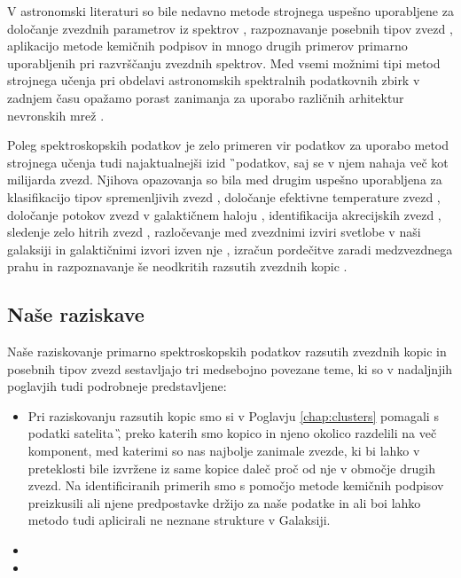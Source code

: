 V astronomski literaturi so bile nedavno metode strojnega uspešno uporabljene za določanje zvezdnih parametrov iz spektrov \cite{2015ApJ...808...16N, buder2018, 2019ApJ...879...69T}, razpoznavanje posebnih tipov zvezd \cite{2017ApJS..228...24T}, aplikacijo metode kemičnih podpisov \cite{2015A&A...577A..47B, 2016ApJ...833..262H,2018MNRAS.473.4612K, 2018A&A...619A.125A, 2017MNRAS.467.1140J, 2018A&A...618A..65B} in mnogo drugih primerov primarno uporabljenih pri razvrščanju zvezdnih spektrov. Med vsemi možnimi tipi metod strojnega učenja pri obdelavi astronomskih spektralnih podatkovnih zbirk v zadnjem času opažamo porast zanimanja za uporabo različnih arhitektur nevronskih mrež \cite{2015MNRAS.452..158Y, 2019MNRAS.483.3255L, 2020ApJ...891...23W, 2020arXiv200208390O}.

Poleg spektroskopskih podatkov je zelo primeren vir podatkov za uporabo metod strojnega učenja tudi najaktualnejši izid \G\ podatkov, saj se v njem nahaja več kot milijarda zvezd. Njihova opazovanja so bila med drugim uspešno uporabljena za klasifikacijo tipov spremenljivih zvezd \cite{2020MNRAS.493.2981B}, določanje efektivne temperature zvezd \cite{2019AJ....158...93B}, določanje potokov zvezd v galaktičnem haloju \cite{2017A&A...598A..58H, 2020MNRAS.492.1370B}, identifikacija akrecijskih zvezd \cite{2019arXiv190706652O, 2019arXiv190707681N}, sledenje zelo hitrih zvezd \cite{2017MNRAS.470.1388M}, razločevanje med zvezdnimi izviri svetlobe v naši galaksiji in galaktičnimi izvori izven nje \cite{2018RAA....18..118B, 2019MNRAS.490.5615B}, izračun pordečitve zaradi medzvezdnega prahu \cite{2020AJ....159...84B} in razpoznavanje še neodkritih razsutih zvezdnih kopic \cite{2020A&A...635A..45C}.

\subsection{Naše raziskave}
\label{sec:slo_raziskave}
Naše raziskovanje primarno spektroskopskih podatkov razsutih zvezdnih kopic in posebnih tipov zvezd sestavljajo tri medsebojno povezane teme, ki so v nadaljnjih poglavjih tudi podrobneje predstavljene:

\begin{itemize}
	\item Pri raziskovanju razsutih kopic smo si v Poglavju \ref{chap:clusters} pomagali s podatki satelita \G, preko katerih smo kopico in njeno okolico razdelili na več komponent, med katerimi so nas najbolje zanimale zvezde, ki bi lahko v preteklosti bile izvržene iz same kopice daleč proč od nje v območje drugih zvezd. Na identificiranih primerih smo s pomočjo metode kemičnih podpisov preizkusili ali njene predpostavke držijo za naše podatke in ali boi lahko metodo tudi aplicirali ne neznane strukture v Galaksiji. 
	
	\item
	
	\item
	
\end{itemize}

